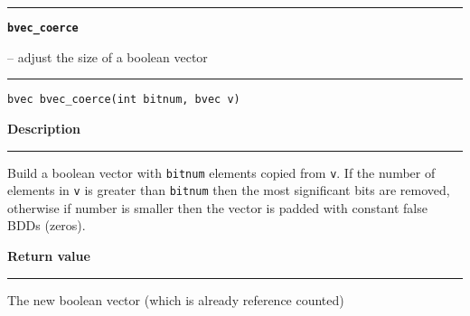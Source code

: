 \begin{minipage}{\textwidth}

\noindent\begin{minipage}{\textwidth}
\rule{\textwidth}{0.5mm}
{\tt\bf bvec\_coerce }
\--- adjust the size of a boolean vector  \hspace{\fill}
\\\rule[1.5ex]{\textwidth}{0.5mm}
\end{minipage}

\noindent\begin{verbatim}
bvec bvec_coerce(int bitnum, bvec v) 
\end{verbatim}

\vspace{\parsep}\noindent
{\bf Description}\\\rule[1.5ex]{\textwidth}{0.2mm}\vspace{-1.5ex}\setlength{\parindent}{1em}
Build a boolean vector with {\tt bitnum} elements copied from
           {\tt v}. If the number of elements in {\tt v} is greater than
	   {\tt bitnum} then the most significant bits are removed, otherwise
	   if number is smaller then the vector is padded with constant
	   false BDDs (zeros). 

\setlength{\parindent}{0em}\vspace{\parsep}\vspace{\baselineskip}\noindent
{\bf Return value}\\\rule[1.5ex]{\textwidth}{0.2mm}\vspace{-1.5ex}
The new boolean vector (which is already reference counted) 
\end{minipage}
\vspace{8ex}
